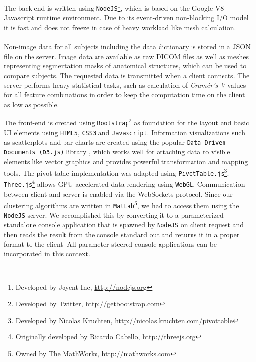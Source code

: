 \documentclass[journal]{style/vgtc} 			          %
\begin{document}
The back-end is written using \texttt{NodeJS}\footnote{Developed by Joyent Inc, \url{http://nodejs.org}}, which is based on the Google V8 Javascript runtime environment.
%
Due to its event-driven non-blocking I/O model it is fast and does not freeze in case of heavy workload like mesh calculation.
\\\\
Non-image data for all subjects including the data dictionary is stored in a JSON file on the server.
%
Image data are available as raw DICOM files as well as meshes representing segmentation masks of anatomical structures, which can be used to compare subjects.
%
The requested data is transmitted when a client connects.
%
The server performs heavy statistical tasks, such as calculation of \emph{Cram\'{e}r's V} values for all feature combinations in order to keep the computation time on the client as low as possible.
%

The front-end is created using \texttt{Bootstrap}\footnote{Developed by Twitter, \url{http://getbootstrap.com}} as foundation for the layout and basic UI elements using \texttt{HTML5}, \texttt{CSS3} and \texttt{Javascript}.
%
Information visualizations such as scatterplots and bar charts are created using the popular \texttt{Data-Driven Documents (D3.js)} library \cite{D3}, which works well for attaching data to visible elements like vector graphics and provides powerful transformation and mapping tools.
%
The pivot table implementation was adapted using \texttt{PivotTable.js}\footnote{Developed by Nicolas Kruchten, \url{http://nicolas.kruchten.com/pivottable}}.
%
\texttt{Three.js}\footnote{Originally developed by Ricardo Cabello, \url{http://threejs.org}} allows GPU-accelerated data rendering using \texttt{WebGL}.
%
Communication between client and server is enabled via the WebSockets protocol.
%
Since our clustering algorithms are written in \texttt{MatLab}\footnote{Owned by The MathWorks, \url{http://mathworks.com}}, we had to access them using the \texttt{NodeJS} server.
%
We accomplished this by converting it to a parameterized standalone console application that is spawned by \texttt{NodeJS} on client request and then reads the result from the console standard out and returns it in a proper format to the client.
%
All parameter-steered console applications can be incorporated in this context.
\\\\
\end{document}
